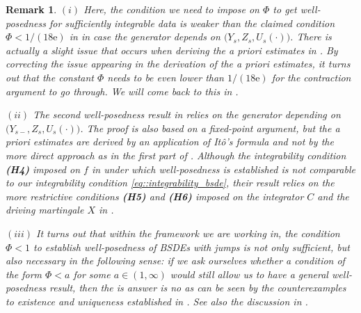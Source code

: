 \documentclass[10pt]{article} %
\newtheorem{remark}[theorem]{Remark}
\begin{document}
\begin{remark}\label{rem::main_bsde}
	$(i)$ Here, the condition we need to impose on $\Phi$ to get well-posedness for sufficiently integrable data is weaker than the claimed condition $\Phi < 1/(18\mathrm{e})$ in {\rm\cite[Corollary 3.6]{papapantoleon2018existence}} in case the generator depends on $\big(Y_s,Z_s,U_s(\cdot)\big)$. There is actually a slight issue that occurs when deriving the \emph{a priori} estimates in {\rm\cite{papapantoleon2018existence}}. By correcting the issue appearing in the derivation of the \emph{a priori} estimates, it turns out that the constant $\Phi$ needs to be even lower than $1/(18\mathrm{e})$ for the contraction argument to go through. We will come back to this in {\rm{}}.
	
	\medskip
	$(ii)$ The second well-posedness result in {\rm\cite[Theorem 3.23]{papapantoleon2018existence}} relies on the generator depending on $\big(Y_{s-},Z_s,U_s(\cdot)\big)$. The proof is also based on a fixed-point argument, but the \emph{a priori} estimates are derived by an application of It\^o's formula and not by the more direct approach as in the first part of {\rm \cite{papapantoleon2018existence}}. Although the integrability condition {\bf(H4)} imposed on $f$ in {\rm\cite{papapantoleon2018existence}} under which well-posedness is established is not comparable to our integrability condition \eqref{eq::integrability_bsde}, their result relies on the more restrictive conditions {\bf(H5)} and {\bf(H6)} imposed on the integrator $C$ and the driving martingale $X$ in {\rm\cite{papapantoleon2018existence}}. 
	
	\medskip
	$(iii)$ It turns out that within the framework we are working in, the condition $\Phi < 1$ to establish well-posedness of  \emph{BSDEs} with jumps is not only sufficient, but also necessary in the following sense: if we ask ourselves whether a condition of the form $\Phi < a$ for some $a \in (1,\infty)$ would still allow us to have a general well-posedness result, then the is answer is no as can be seen by the counterexamples to existence and uniqueness established in {\rm\citeauthor*{confortola2014backward} \cite[Section 4.3]{confortola2014backward}}. See also the discussion in {\rm\citeauthor*{papapantoleon2018existence} \cite[Section 3.3.1]{papapantoleon2018existence}}. 
	

\end{remark}
\end{document}
